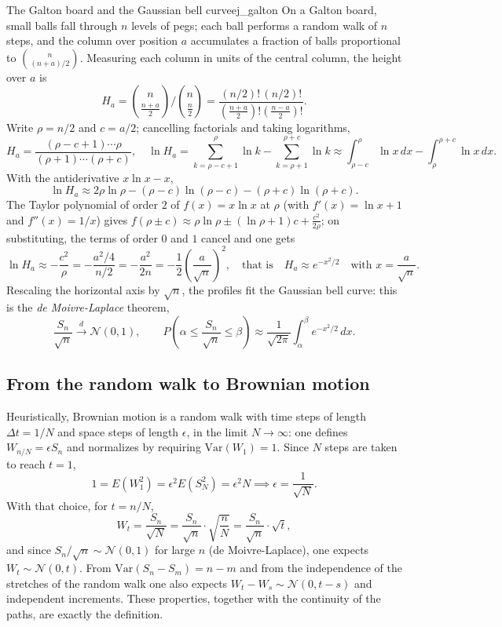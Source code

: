 \documentclass[11pt, a4paper]{article}
\begin{document}
\begin{ejemplo}{The Galton board and the Gaussian bell curve}{ej_galton}
On a Galton board, small balls fall through $n$ levels of pegs; each ball performs a random
walk of $n$ steps, and the column over position $a$ accumulates a fraction of balls
proportional to $\binom{n}{(n+a)/2}$. Measuring each column in units of the central column,
the height over $a$ is
$$ H_a = \binom{n}{\frac{n+a}{2}} \Big/ \binom{n}{\frac{n}{2}} =
\frac{(n/2)! \, (n/2)!}{\left(\frac{n+a}{2}\right)! \left(\frac{n-a}{2}\right)!}. $$
Write $\rho = n/2$ and $c = a/2$; cancelling factorials and taking logarithms,
$$ H_a = \frac{(\rho - c + 1) \cdots \rho}{(\rho + 1) \cdots (\rho + c)}, \quad
\ln H_a = \sum_{k = \rho - c + 1}^{\rho} \ln k - \sum_{k = \rho + 1}^{\rho + c} \ln k
\approx \int_{\rho - c}^{\rho} \ln x \, dx - \int_{\rho}^{\rho + c} \ln x \, dx. $$
With the antiderivative $x \ln x - x$,
$$ \ln H_a \approx 2 \rho \ln \rho - (\rho - c) \ln(\rho - c) - (\rho + c) \ln(\rho + c). $$
The Taylor polynomial of order $2$ of $f(x) = x \ln x$ at $\rho$ (with $f'(x) = \ln x + 1$ and
$f''(x) = 1/x$) gives $f(\rho \pm c) \approx \rho \ln \rho \pm (\ln \rho + 1) c +
\frac{c^2}{2\rho}$; on substituting, the terms of order $0$ and $1$ cancel and one gets
$$ \ln H_a \approx -\frac{c^2}{\rho} = -\frac{a^2/4}{n/2} = -\frac{a^2}{2n}
= -\frac{1}{2} \left( \frac{a}{\sqrt{n}} \right)^{\!2}, \quad \text{that is} \quad
H_a \approx e^{-x^2/2} \quad \text{with } x = \frac{a}{\sqrt{n}}. $$
Rescaling the horizontal axis by $\sqrt{n}$, the profiles fit the Gaussian bell curve:
this is the \emph{de Moivre-Laplace} theorem,
$$ \frac{S_n}{\sqrt{n}} \xrightarrow{d} \mathcal{N}(0, 1), \qquad
P\!\left( \alpha \le \frac{S_n}{\sqrt{n}} \le \beta \right) \approx \frac{1}{\sqrt{2 \pi}}
\int_\alpha^\beta e^{-x^2/2} \, dx. $$
\end{ejemplo}

\subsection{From the random walk to Brownian motion}

Heuristically, Brownian motion is a random walk with time steps of length
$\Delta t = 1/N$ and space steps of length $\epsilon$, in the limit $N \to \infty$: one
defines $W_{n/N} = \epsilon S_n$ and normalizes by requiring $\mathrm{Var}(W_1) = 1$. Since
$N$ steps are taken to reach $t = 1$,
$$ 1 = E(W_1^2) = \epsilon^2 E(S_N^2) = \epsilon^2 N \implies \epsilon = \frac{1}{\sqrt{N}}. $$
With that choice, for $t = n/N$,
$$ W_t = \frac{S_n}{\sqrt{N}} = \frac{S_n}{\sqrt{n}} \cdot \sqrt{\frac{n}{N}} =
\frac{S_n}{\sqrt{n}} \cdot \sqrt{t}, $$
and since $S_n / \sqrt{n} \sim \mathcal{N}(0, 1)$ for large $n$ (de Moivre-Laplace), one expects
$W_t \sim \mathcal{N}(0, t)$. From $\mathrm{Var}(S_n - S_m) = n - m$ and from the independence of the
stretches of the random walk one also expects $W_t - W_s \sim \mathcal{N}(0, t - s)$ and independent
increments. These properties, together with the continuity of the paths, are
exactly the definition.
\end{document}
